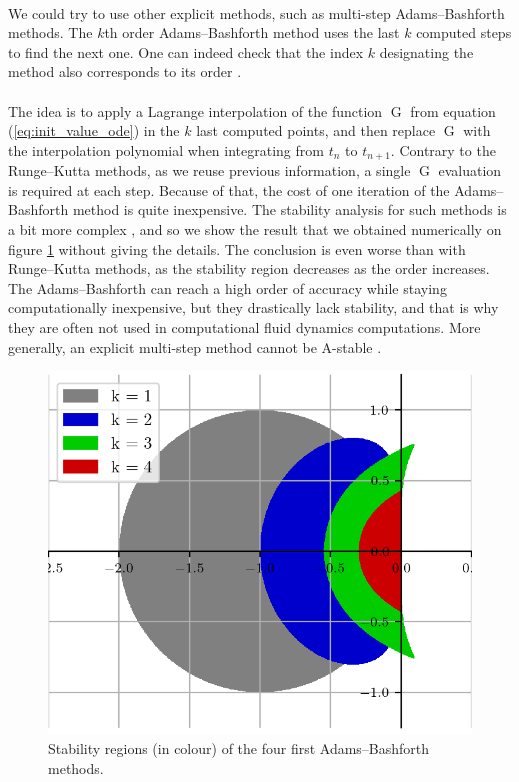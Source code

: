         \paragraph{}
        We could try to use other explicit methods, such as multi-step Adams--Bashforth methods.
        The $k$th order Adams--Bashforth method uses the last $k$ computed steps to find the next one.
        One can indeed check that the index $k$ designating the method also corresponds to its order \cite{HairerNorsettWanner1993}.

        \paragraph{}
        The idea is to apply a Lagrange interpolation of the function $\operatorname{G}$ from equation (\ref{eq:init_value_ode}) in the $k$ last computed points, and then replace $\operatorname{G}$ with the interpolation polynomial when integrating from $t_n$ to $t_{n+1}$.
        Contrary to the Runge--Kutta methods, as we reuse previous information, a single $\operatorname{G}$ evaluation is required at each step.
        Because of that, the cost of one iteration of the Adams--Bashforth method is quite inexpensive.
        The stability analysis for such methods is a bit more complex \cite{HairerNorsettWanner1993, HairerWanner1996}, and so we show the result that we obtained numerically on figure \ref{fig:ab_stab} without giving the details.
        The conclusion is even worse than with Runge--Kutta methods, as the stability region decreases as the order increases.
        The Adams--Bashforth can reach a high order of accuracy while staying computationally inexpensive, but they drastically lack stability, and that is why they are often not used in computational fluid dynamics computations.
        More generally, an explicit multi-step method cannot be A-stable \cite{Dahlquist1963}.

        \begin{figure}
          \centering
          \includegraphics{figures/ab_stab.png}
          \caption{Stability regions (in colour) of the four first Adams--Bashforth methods.}
          \label{fig:ab_stab}
        \end{figure}


